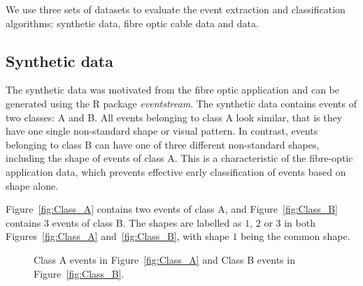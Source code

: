 \documentclass[a4paper,11pt]{article}
\begin{document}
We use three sets of datasets to evaluate the event extraction and classification algorithms: synthetic data, fibre optic cable data and  data.

\subsection{Synthetic data}\label{subsec:Synthetic}

The synthetic data was motivated from the fibre optic application and can be generated using the R package \textit{eventstream}. The synthetic data contains events of two classes: A and B. All events belonging to class A look similar, that is they have one single non-standard shape or visual pattern. In contrast, events belonging to class B can have one of three different non-standard shapes, including the shape of events of class A. This is a characteristic of the fibre-optic application data, which prevents effective early classification of events based on shape alone.

Figure~\ref{fig:Class_A} contains two events of class A, and Figure~\ref{fig:Class_B} contains 3 events of class B. The shapes are labelled as $1$, $2$ or $3$ in both Figures~\ref{fig:Class_A} and~\ref{fig:Class_B}, with shape $1$ being the common shape.

\begin{figure}[!hbt]
	\centering
	\caption{Class A events in Figure~\ref{fig:Class_A} and Class B events in Figure~\ref{fig:Class_B}.}
	\label{fig:Classes_A_And_B}
\end{figure}
\end{document}
